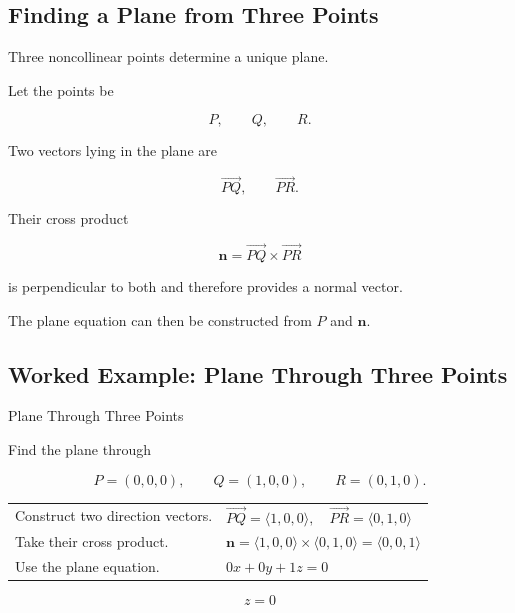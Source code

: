 \subsection{Finding a Plane from Three Points}
\label{subsec:plane-three-points}

Three noncollinear points determine a unique plane.

Let the points be

\[ P,\qquad Q,\qquad R. \]

Two vectors lying in the plane are

\[ \overrightarrow{PQ},\qquad\overrightarrow{PR}. \]

Their cross product

\[
\boxed{
\mathbf{n}
=
\overrightarrow{PQ}\times\overrightarrow{PR}
}
\]

is perpendicular to both and therefore provides a normal vector.

The plane equation can then be constructed from \(P\) and \(\mathbf{n}\).

\subsection{Worked Example: Plane Through Three Points}
\label{subsec:worked-plane-three-points}

\begin{workedexamplebox}{Plane Through Three Points}

Find the plane through

\[
P=(0,0,0),\qquad
Q=(1,0,0),\qquad
R=(0,1,0).
\]

\begin{tabularx}{\textwidth}{@{}>{\raggedright\arraybackslash}p{}X@{}}
Construct two direction vectors. &
\(\overrightarrow{PQ}=\langle1,0,0\rangle,\quad
\overrightarrow{PR}=\langle0,1,0\rangle\)\\
Take their cross product. &
\(\mathbf{n}
=\langle1,0,0\rangle\times\langle0,1,0\rangle
=\langle0,0,1\rangle\)\\
Use the plane equation. &
\(0x+0y+1z=0\)
\end{tabularx}

\begin{answerbox}
\[ \boxed{z=0} \]
\end{answerbox}
\end{workedexamplebox}

